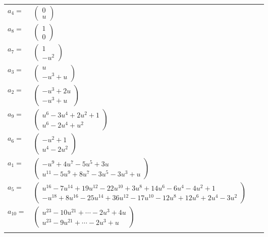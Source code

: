 \documentclass[1p]{elsarticle_modified}
\theoremstyle{definition}
\begin{document}
\begin{tabular}{m{7pt} m{180pt} m{7pt} m{180pt} }
\flushright $a_{4}=$&$\begin{pmatrix}0\\u\end{pmatrix}$ \\
\flushright $a_{8}=$&$\begin{pmatrix}1\\0\end{pmatrix}$ \\
\flushright $a_{7}=$&$\begin{pmatrix}1\\- u^2\end{pmatrix}$ \\
\flushright $a_{3}=$&$\begin{pmatrix}u\\- u^3+u\end{pmatrix}$ \\
\flushright $a_{2}=$&$\begin{pmatrix}- u^3+2 u\\- u^3+u\end{pmatrix}$ \\
\flushright $a_{9}=$&$\begin{pmatrix}u^6-3 u^4+2 u^2+1\\u^6-2 u^4+u^2\end{pmatrix}$ \\
\flushright $a_{6}=$&$\begin{pmatrix}- u^2+1\\u^4-2 u^2\end{pmatrix}$ \\
\flushright $a_{1}=$&$\begin{pmatrix}- u^9+4 u^7-5 u^5+3 u\\u^{11}-5 u^9+8 u^7-3 u^5-3 u^3+u\end{pmatrix}$ \\
\flushright $a_{5}=$&$\begin{pmatrix}u^{16}-7 u^{14}+19 u^{12}-22 u^{10}+3 u^8+14 u^6-6 u^4-4 u^2+1\\- u^{18}+8 u^{16}-25 u^{14}+36 u^{12}-17 u^{10}-12 u^8+12 u^6+2 u^4-3 u^2\end{pmatrix}$ \\
\flushright $a_{10}=$&$\begin{pmatrix}u^{23}-10 u^{21}+\cdots-2 u^3+4 u\\u^{23}-9 u^{21}+\cdots-2 u^3+u\end{pmatrix}$\\&\end{tabular}
\end{document}
